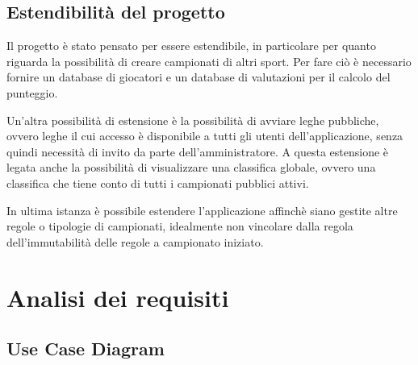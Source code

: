 \documentclass[twoside,openright,titlepage,fleqn,headinclude,12pt,a4paper,BCOR=5mm,footinclude]{scrbook}
\begin{document}
\section{Estendibilità del progetto}
Il progetto è stato pensato per essere estendibile, in particolare per quanto riguarda la possibilità di creare campionati di altri sport.
Per fare ciò è necessario fornire un database di giocatori e un database di valutazioni per il calcolo del punteggio.

Un'altra possibilità di estensione è la possibilità di avviare leghe pubbliche, ovvero leghe il cui accesso è disponibile a tutti gli utenti 
dell'applicazione, senza quindi necessità di invito da parte dell'amministratore. A questa estensione è legata anche la possibilità di visualizzare una
classifica globale, ovvero una classifica che tiene conto di tutti i campionati pubblici attivi.

In ultima istanza è possibile estendere l'applicazione affinchè siano gestite altre regole o tipologie di campionati, idealmente non vincolare dalla regola
dell'immutabilità delle regole a campionato iniziato.

\chapter{Analisi dei requisiti}
\section{Use Case Diagram}
\end{document}
